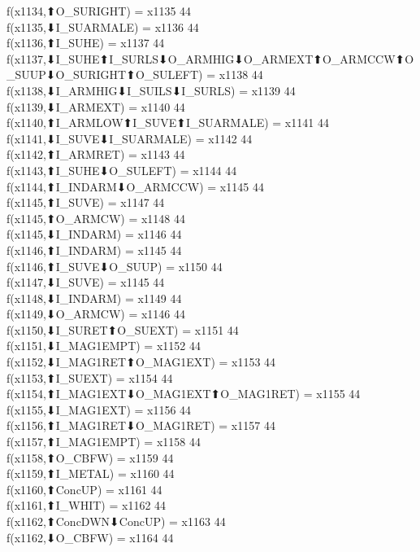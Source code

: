 f(x1134,⬆O_SURIGHT) = x1135 {44} \\
f(x1135,⬇I_SUARMALE) = x1136 {44} \\
f(x1136,⬆I_SUHE) = x1137 {44} \\
f(x1137,⬇I_SUHE⬆I_SURLS⬇O_ARMHIG⬇O_ARMEXT⬆O_ARMCCW⬆O_SUUP⬇O_SURIGHT⬆O_SULEFT) = x1138 {44} \\
f(x1138,⬇I_ARMHIG⬇I_SUILS⬇I_SURLS) = x1139 {44} \\
f(x1139,⬇I_ARMEXT) = x1140 {44} \\
f(x1140,⬆I_ARMLOW⬆I_SUVE⬆I_SUARMALE) = x1141 {44} \\
f(x1141,⬇I_SUVE⬇I_SUARMALE) = x1142 {44} \\
f(x1142,⬆I_ARMRET) = x1143 {44} \\
f(x1143,⬆I_SUHE⬇O_SULEFT) = x1144 {44} \\
f(x1144,⬆I_INDARM⬇O_ARMCCW) = x1145 {44} \\
f(x1145,⬆I_SUVE) = x1147 {44} \\
f(x1145,⬆O_ARMCW) = x1148 {44} \\
f(x1145,⬇I_INDARM) = x1146 {44} \\
f(x1146,⬆I_INDARM) = x1145 {44} \\
f(x1146,⬆I_SUVE⬇O_SUUP) = x1150 {44} \\
f(x1147,⬇I_SUVE) = x1145 {44} \\
f(x1148,⬇I_INDARM) = x1149 {44} \\
f(x1149,⬇O_ARMCW) = x1146 {44} \\
f(x1150,⬇I_SURET⬆O_SUEXT) = x1151 {44} \\
f(x1151,⬇I_MAG1EMPT) = x1152 {44} \\
f(x1152,⬇I_MAG1RET⬆O_MAG1EXT) = x1153 {44} \\
f(x1153,⬆I_SUEXT) = x1154 {44} \\
f(x1154,⬆I_MAG1EXT⬇O_MAG1EXT⬆O_MAG1RET) = x1155 {44} \\
f(x1155,⬇I_MAG1EXT) = x1156 {44} \\
f(x1156,⬆I_MAG1RET⬇O_MAG1RET) = x1157 {44} \\
f(x1157,⬆I_MAG1EMPT) = x1158 {44} \\
f(x1158,⬆O_CBFW) = x1159 {44} \\
f(x1159,⬆I_METAL) = x1160 {44} \\
f(x1160,⬆ConcUP) = x1161 {44} \\
f(x1161,⬆I_WHIT) = x1162 {44} \\
f(x1162,⬆ConcDWN⬇ConcUP) = x1163 {44} \\
f(x1162,⬇O_CBFW) = x1164 {44} \\
